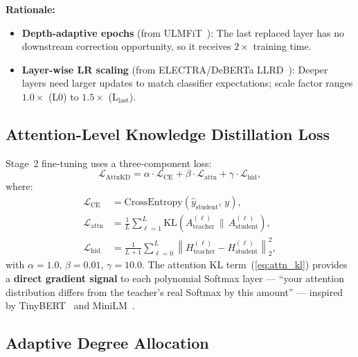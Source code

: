 \documentclass[12pt, a4paper]{article}
\begin{document}
\textbf{Rationale:}
\begin{itemize}[leftmargin=2em]
  \item \textbf{Depth-adaptive epochs} (from ULMFiT~\cite{ulmfit}): The last replaced layer has no downstream correction opportunity, so it receives $2\times$ training time.
  \item \textbf{Layer-wise LR scaling} (from ELECTRA/DeBERTa LLRD~\cite{electra}): Deeper layers need larger updates to match classifier expectations; scale factor ranges $1.0\times$ (L0) to $1.5\times$ ($\text{L}_{\text{last}}$).
\end{itemize}

\subsection{Attention-Level Knowledge Distillation Loss}

Stage~2 fine-tuning uses a three-component loss:
\begin{equation}
  \mathcal{L}_{\text{AttnKD}} = \alpha \cdot \mathcal{L}_{\text{CE}} + \beta \cdot \mathcal{L}_{\text{attn}} + \gamma \cdot \mathcal{L}_{\text{hid}},
  \label{eq:attnkd_loss}
\end{equation}
where:
\begin{align}
  \mathcal{L}_{\text{CE}}   &= \text{CrossEntropy}(\hat{y}_{\text{student}},\, y), \label{eq:ce} \\
  \mathcal{L}_{\text{attn}} &= \frac{1}{L}\sum_{\ell=1}^{L} \text{KL}\!\left(A^{(\ell)}_{\text{teacher}} \,\|\, A^{(\ell)}_{\text{student}}\right), \label{eq:attn_kl} \\
  \mathcal{L}_{\text{hid}}  &= \frac{1}{L+1}\sum_{\ell=0}^{L} \left\| H^{(\ell)}_{\text{teacher}} - H^{(\ell)}_{\text{student}} \right\|_2^2, \label{eq:hid_mse}
\end{align}
with $\alpha = 1.0$, $\beta = 0.01$, $\gamma = 10.0$. The attention KL term~(\ref{eq:attn_kl}) provides a \textbf{direct gradient signal} to each polynomial Softmax layer --- ``your attention distribution differs from the teacher's real Softmax by this amount'' --- inspired by TinyBERT~\cite{tinybert} and MiniLM~\cite{minilm}.

\subsection{Adaptive Degree Allocation}
\end{document}
